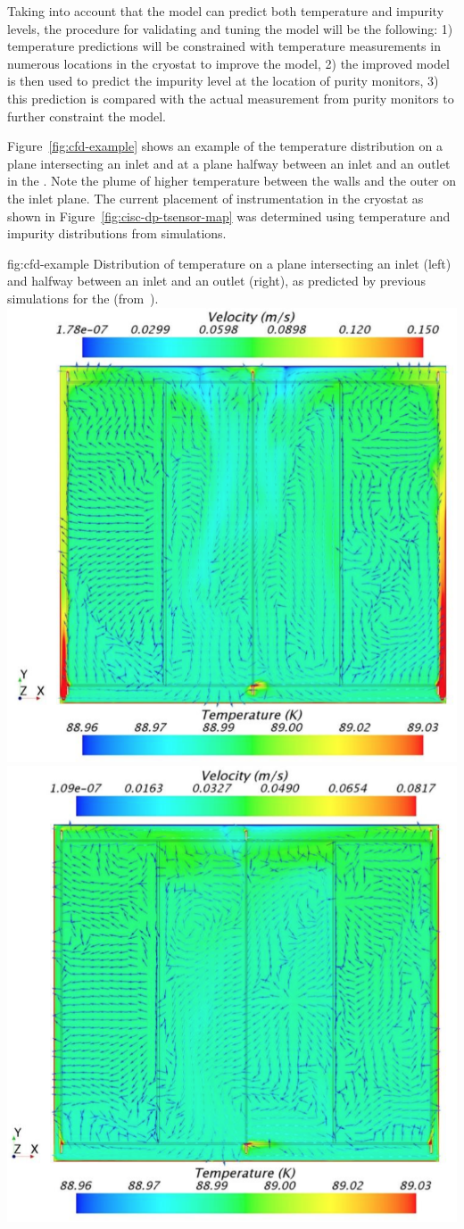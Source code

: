 Taking into account that the  model can predict both temperature and impurity levels, the procedure for validating and tuning the  model will be the following: 1) temperature predictions will be constrained with temperature measurements in numerous locations in the cryostat to improve the  model, 2) the improved model is then used to predict the \lar impurity level at the location of purity monitors, 3) this prediction is compared with the actual measurement from purity monitors to further constraint the  model.  



Figure~\ref{fig:cfd-example} shows an example of the temperature
distribution on a plane intersecting an \lar inlet and at a
plane halfway between an inlet and an outlet in the .
Note the plume of higher temperature \lar between the walls and
the outer  on the inlet plane. The current placement of instrumentation in
the cryostat as shown in Figure~\ref{fig:cisc-dp-tsensor-map} was determined using temperature and impurity distributions from  simulations.

\begin{dunefigure}{fig:cfd-example}
  {Distribution of temperature on a plane intersecting an inlet (left) and halfway between an inlet and an outlet (right), as predicted by previous  simulations for the  (from~\cite{bib:docdb5915}).}
  \includegraphics[height=0.4\textwidth]{graphics/cisc_cfd_inlet_z52.png}
  \includegraphics[height=0.4\textwidth]{graphics/cisc_cfd_outlet_z0.png}
\end{dunefigure}

